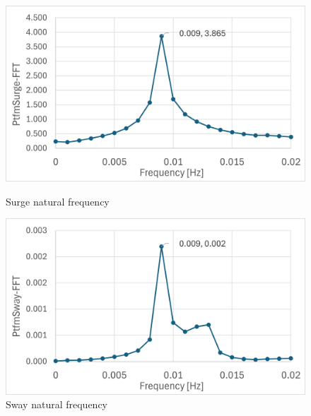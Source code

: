 \documentclass[a4paper]{article}
\begin{document}
\begin{figure}[H]
    \begin{minipage}{0.49\textwidth}
        \centering
        \includegraphics[width=1\textwidth]{nat_freq_surge.png}
        \caption{\small Surge natural frequency}
        \label{fig:nat_freq_surge}
    \end{minipage}
    \hfill
    \begin{minipage}{0.5\textwidth}
        \centering
        \includegraphics[width=1\textwidth]{nat_freq_sway.png}
        \caption{\small Sway natural frequency}
        \label{fig:nat_freq_sway}
    \end{minipage}
\end{figure}
\end{document}
